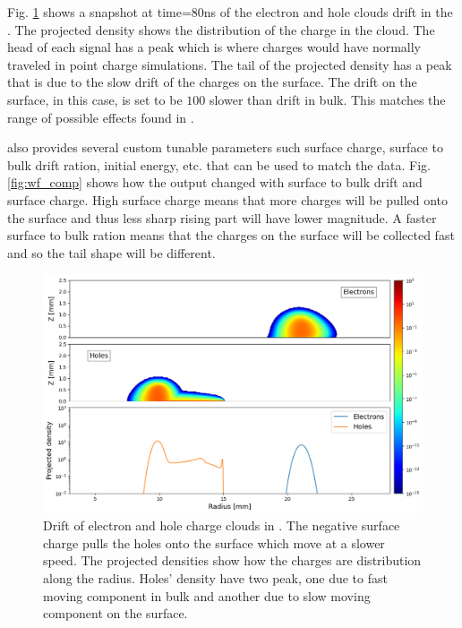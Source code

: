 Fig. \ref{fig:ehd_path_pd} shows a snapshot at time=$80$ns of the electron and hole clouds drift in the {\tdsim}. The projected density shows the distribution of the charge in the cloud. The head of each signal has a peak which is where charges would have normally traveled in point charge simulations. The tail of the projected density has a peak that is due to the slow drift of the charges on the surface. The drift on the surface, in this case, is set to be $100$ slower than drift in bulk. This matches the range of possible effects found in \cite{MULLOWNEY201233}. 

{\tdsim} also provides several custom tunable parameters such surface charge, surface to bulk drift ration, initial energy, etc. that can be used to match the data. Fig. \ref{fig:wf_comp} shows how the output changed with surface to bulk drift and surface charge. High surface charge means that more charges will be pulled onto the surface and thus less sharp rising part will have lower magnitude. A faster surface to bulk ration means that the charges on the surface will be collected fast and so the tail shape will be different.


\begin{figure}
    \includegraphics[trim={0cm 0 0cm 0},clip,width=0.99\linewidth]{ch3/figs/drift_path.png}
    \caption{Drift of electron and hole charge clouds in {\tdsim}. The negative surface charge pulls the holes onto the surface which move at a slower speed. The projected densities show how the charges are distribution along the radius. Holes' density have two peak, one due to fast moving component in bulk and another due to slow moving component on the surface.}
    \label{fig:ehd_path_pd}
\end{figure}


